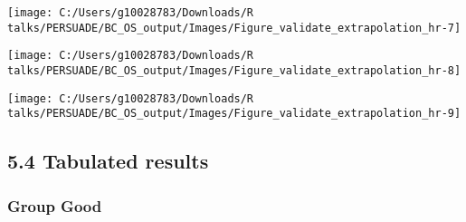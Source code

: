 \documentclass[
]{article}
\begin{document}
\begin{flushleft}\texttt{[image: C:/Users/g10028783/Downloads/R talks/PERSUADE/BC\_OS\_output/Images/Figure\_validate\_extrapolation\_hr-7]} \end{flushleft}

\begin{flushleft}\texttt{[image: C:/Users/g10028783/Downloads/R talks/PERSUADE/BC\_OS\_output/Images/Figure\_validate\_extrapolation\_hr-8]} \end{flushleft}

\begin{flushleft}\texttt{[image: C:/Users/g10028783/Downloads/R talks/PERSUADE/BC\_OS\_output/Images/Figure\_validate\_extrapolation\_hr-9]} \end{flushleft}

\clearpage

\subsection{5.4 Tabulated results}\label{tabulated-results}

\subsubsection{Group Good}\label{group-good}
\end{document}
